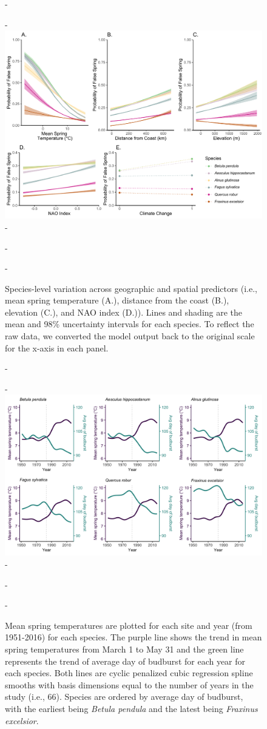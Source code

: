 \documentclass{article}\usepackage[]{graphicx}\usepackage[]{color}
\begin{document}
{\begin{figure} [H]
  -\begin{center}
  -\includegraphics[width=16cm]{..//analyses/figures/InteractionPlots/Species_orig_98.pdf}
  -\caption{Species-level variation across geographic and spatial predictors (i.e., mean spring temperature (A.), distance from the coast (B.), elevation (C.), and NAO index (D.)). Lines and shading are the mean and 98\% uncertainty intervals for each species. To reflect the raw data, we converted the model output back to the original scale for the x-axis in each panel. }\label{fig:spp}
  -\end{center}
  -\end{figure}}
  
  \renewcommand{\thefigure}{S1}
  {\begin{figure} [H]
  -\begin{center}
  -\includegraphics[width=16cm]{..//analyses/figures/MSTBB_bySpp_lines.png}
  -\caption{Mean spring temperatures are plotted for each site and year (from 1951-2016) for each species. The purple line shows the trend in mean spring temperatures from March 1 to May 31 and the green line represents the trend of average day of budburst for each year for each species. Both lines are cyclic penalized cubic regression spline smooths with basis dimensions equal to the number of years in the study (i.e., 66). Species are ordered by average day of budburst, with the earliest being \textit{Betula pendula} and the latest being \textit{Fraxinus excelsior}. }\label{fig:mst}
  -\end{center}
  -\end{figure}}
\end{document}
